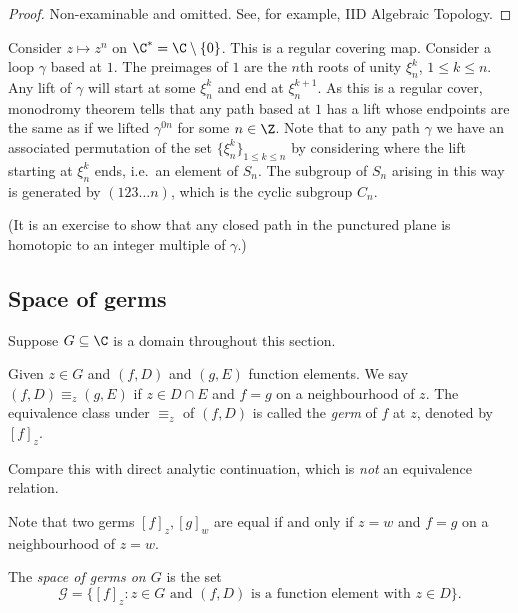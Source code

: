 \documentclass[a4paper]{article}
\begin{document}
\begin{proof}
  Non-examinable and omitted. See, for example, IID Algebraic Topology.
\end{proof}

\begin{eg}
  Consider \(z \mapsto z^n\) on \(\C^* = \C \setminus \{0\}\). This is a regular covering map. Consider a loop \(\gamma\) based at \(1\). The preimages of \(1\) are the \(n\)th roots of unity \(\xi_n^k\), \(1 \leq k \leq n\). Any lift of \(\gamma\) will start at some \(\xi_n^k\) and end at \(\xi_n^{k + 1}\). As this is a regular cover, monodromy theorem tells that any path based at \(1\) has a lift whose endpoints are the same as if we lifted \(\gamma^{0n}\) for some \(n \in \Z\). Note that to any path \(\gamma\) we have an associated permutation of the set \(\{\xi_n^k\}_{1 \leq k \leq n}\) by considering where the lift starting at \(\xi_n^k\) ends, i.e.\ an element of \(S_n\). The subgroup of \(S_n\) arising in this way is generated by \((123\dots n)\), which is the cyclic subgroup \(C_n\).

  (It is an exercise to show that any closed path in the punctured plane is homotopic to an integer multiple of \(\gamma\).)
\end{eg}

\subsection{Space of germs}

Suppose \(G \subseteq \C\) is a domain throughout this section.

\begin{definition}[germ]
  Given \(z \in G\) and \((f, D)\) and \((g, E)\) function elements. We say \((f, D) \equiv_z (g, E)\) if \(z \in D \cap E\) and \(f = g\) on a neighbourhood of \(z\). The equivalence class under \(\equiv_z\) of \((f, D)\) is called the \emph{germ} of \(f\) at \(z\), denoted by \([f]_z\).
\end{definition}

Compare this with direct analytic continuation, which is \emph{not} an equivalence relation.

Note that two germs \([f]_z, [g]_w\) are equal if and only if \(z = w\) and \(f = g\) on a neighbourhood of \(z = w\).

\begin{definition}
  The \emph{space of germs on \(G\)} is the set
  \[
    \mathcal G = \{[f]_z: z \in G \text{ and } (f, D) \text{ is a function element with } z \in D\}.
  \]
\end{definition}
\end{document}
